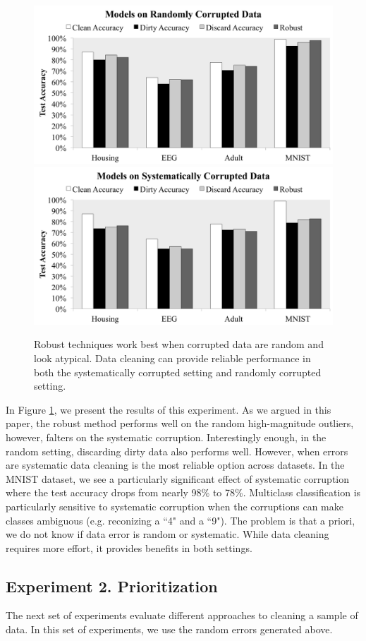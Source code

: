 \begin{figure}[ht!]
\centering
 \includegraphics[width=0.8\columnwidth]{exp/exp2.pdf}
 \includegraphics[width=0.8\columnwidth]{exp/exp1.pdf}
 \caption{Robust techniques work best when corrupted data are random and look atypical. Data cleaning can provide reliable performance in both the systematically corrupted setting and randomly corrupted setting.\label{sys-rand}}
\end{figure}

In Figure \ref{sys-rand}, we present the results of this experiment.
As we argued in this paper, the robust method performs well on the random high-magnitude outliers, however, falters on the systematic corruption.
Interestingly enough, in the random setting, discarding dirty data also performs well.
However, when errors are systematic data cleaning is the most reliable option across datasets.
In the MNIST dataset, we see a particularly significant effect of systematic corruption
where the test accuracy drops from nearly 98\% to 78\%.
Multiclass classification is particularly sensitive to systematic corruption when the corruptions can make classes ambiguous (e.g. reconizing a ``4" and a ``9").
The problem is that a priori, we do not know if data error is random or systematic.
While data cleaning requires more effort, it provides benefits in both settings.

\subsection{Experiment 2. Prioritization}
The next set of experiments evaluate different approaches to cleaning a sample of data.
In this set of experiments, we use the random errors generated above.

